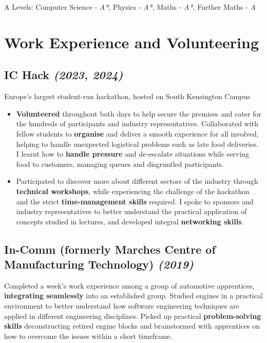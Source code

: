 \documentclass{article}
\newcommand{\dates}[1]{\hfill\textit{(#1)}}
\newcommand{\tab}{\hspace{0.5cm}}
\newcommand{\indentedblock}[1]{
    \hfill
    \begin{minipage}{\dimexpr\textwidth - 0.65cm}
        #1
    \end{minipage}
}
\newcommand{\alevel}[2]{#1 - \textit{#2}}
\begin{document}
{\tab}A Levels: 
    \alevel{Computer Science}{A*},
    \alevel{Physics}{A*},
    \alevel{Maths}{A*},
    \alevel{Further Maths}{A}



\section*{Work Experience and Volunteering}

\subsection*{\textbf{IC Hack} \dates{2023, 2024}}
{\tab}Europe's largest student-run hackathon, hosted on South Kensington Campus

\begin{itemize}
    
    \item \textbf{Volunteered} throughout both days to help secure the premises and cater for the hundreds of participants and industry representatives. 
    Collaborated with fellow students to \textbf{organise} and deliver a smooth experience for all involved, helping to handle unexpected logistical problems such as late 
    food deliveries. I learnt how to \textbf{handle pressure} and de-escalate situations while serving food to customers, 
    managing queues and disgruntled participants.

    \item Participated to discover more about different sectors of the industry through \textbf{technical workshops}, 
    while experiencing the challenge of the hackathon and the strict \textbf{time-management skills} required.
    I spoke to sponsors and industry representatives to better understand the practical application of concepts studied in lectures, 
    and developed integral \textbf{networking skills}.

\end{itemize}


\subsection*{\textbf{In-Comm} (formerly Marches Centre of Manufacturing Technology) \dates{2019}}
\indentedblock{
    Completed a week's work experience among a group of automotive apprentices, \textbf{integrating seamlessly} into an established group.
    Studied engines in a practical environment to better understand how software engineering techniques are applied in 
    different engineering disciplines. Picked up practical \textbf{problem-solving skills} deconstructing retired engine blocks
    and brainstormed with apprentices on how to overcome the issues within a short timeframe.
}
\end{document}
